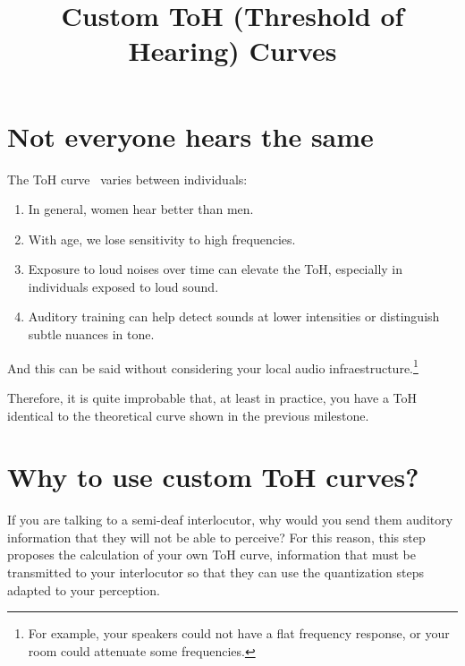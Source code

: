 
\title{Custom ToH (Threshold of Hearing) Curves}

\maketitle
\tableofcontents

\section{Not everyone hears the same}

The ToH curve~\cite{bosi2003intro} varies between individuals:
\begin{enumerate}
\item In general, women hear better than men.
\item With age, we lose sensitivity to high frequencies.
\item Exposure to loud noises over time can elevate the ToH,
  especially in individuals exposed to loud sound.
\item Auditory training can help detect sounds at lower intensities or
  distinguish subtle nuances in tone.
\end{enumerate}

And this can be said without considering your local audio
infraestructure.\footnote{For example,
  your speakers could not have a flat frequency response, or your room
  could attenuate some frequencies.}

Therefore, it is quite improbable that, at least in practice, you
have a ToH identical to the theoretical curve shown in the previous
milestone.

\section{Why to use custom ToH curves?}

If you are talking to a semi-deaf interlocutor, why would you send
them auditory information that they will not be able to perceive? For
this reason, this step proposes the calculation of your own ToH curve,
information that must be transmitted to your interlocutor so that they
can use the quantization steps adapted to your perception.

